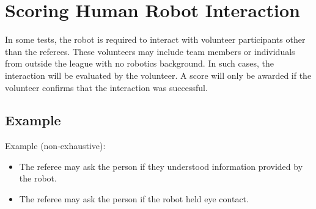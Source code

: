 \section{Scoring Human Robot Interaction}\label{sec:rules:hri}
In some tests, the robot is required to interact with volunteer participants other than the referees. These volunteers may include team members or individuals from outside the league with no robotics background.
In such cases, the interaction will be evaluated by the volunteer.
A score will only be awarded if the volunteer confirms that the interaction was successful.

\subsection*{Example}\label{rule:hri_example}
Example (non-exhaustive):
\begin{itemize}[noitemsep]
	\item The referee may ask the person if they understood information provided by the robot.
	\item The referee may ask the person if the robot held eye contact.
\end{itemize}
